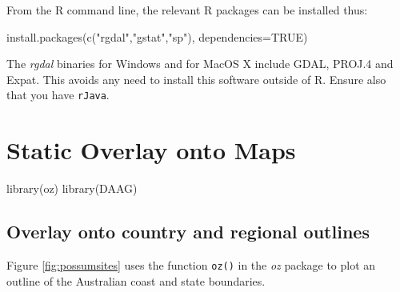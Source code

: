\documentclass{tufte-book}\usepackage[]{graphicx}\usepackage[]{color}
\newcommand{\txtt}[1]{\texttt{#1}}
\begin{document}
From the R command line, the relevant R packages can be installed thus:
\begin{Schunk}
\begin{Sinput}
install.packages(c("rgdal","gstat","sp"),
                 dependencies=TRUE)
\end{Sinput}
\end{Schunk}

The {\em rgdal} binaries for Windows and for MacOS X include GDAL,
PROJ.4 and Expat. This avoids any need to install this software
outside of R. Ensure also that you have \txtt{rJava}.

\section{Static Overlay onto Maps}

\begin{Schunk}
\begin{Sinput}
library(oz)
library(DAAG)
\end{Sinput}
\end{Schunk}

\subsection{Overlay onto country and regional outlines}

Figure \ref{fig:possumsites} uses the function \txtt{oz()} in the
\textit{oz} package to plot an outline of the Australian coast and
state boundaries.
\end{document}
